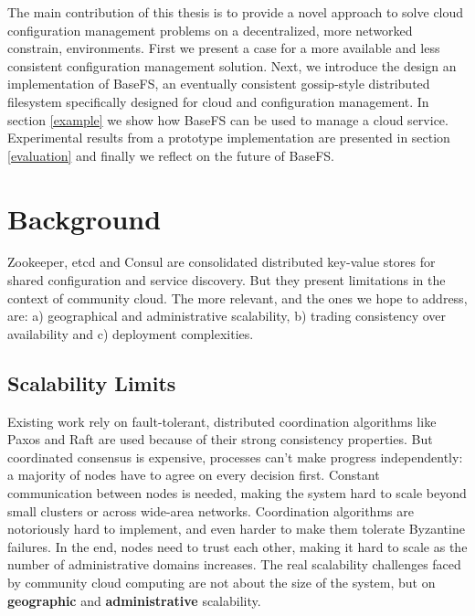 \documentclass{sig-alternate}
\begin{document}
The main contribution of this thesis is to provide a novel approach to solve cloud configuration management problems on a decentralized, more networked constrain, environments. First we present a case for a more available and less consistent configuration management solution. Next, we introduce the design an implementation of BaseFS, an eventually consistent gossip-style distributed filesystem specifically designed for cloud and configuration management. In section \ref{example} we show how BaseFS can be used to manage a cloud service. Experimental results from a prototype implementation are presented in section \ref{evaluation} and finally we reflect on the future of BaseFS.

\section{Background}

Zookeeper, etcd and Consul are consolidated distributed key-value stores for shared configuration and service discovery. But they present limitations in the context of community cloud. The more relevant, and the ones we hope to address, are: a) geographical and administrative scalability, b) trading consistency over availability and c) deployment complexities.

\subsection{Scalability Limits}

Existing work rely on fault-tolerant, distributed coordination algorithms like Paxos\cite{lamport2001paxos} and Raft\cite{ongaro2014search} are used because of their strong consistency properties. But coordinated consensus is expensive, processes can't make progress independently: a majority of nodes have to agree on every decision first. Constant communication between nodes is needed, making the system hard to scale beyond small clusters or across wide-area networks. 
Coordination algorithms are notoriously hard to implement\cite{ongaro2014search}, and even harder to make them tolerate Byzantine failures. In the end, nodes need to trust each other, making it hard to scale as the number of administrative domains increases. The real scalability challenges faced by community cloud computing are not about the size of the system, but on \textbf{geographic} and \textbf{administrative} scalability.

\end{document}
